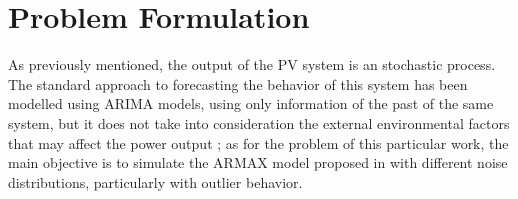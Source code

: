 \section{Problem Formulation}\label{sec:probForm}
As previously mentioned, the output of the PV system is an stochastic process. The standard approach to forecasting the behavior of this system has been modelled using ARIMA models, using only information of the past of the same system, but it does not take into consideration the external environmental factors that may affect the power output \cite{li2014armax}; as for the problem of this particular work, the main objective is to simulate the ARMAX model proposed in \cite{li2014armax} with different noise distributions, particularly with outlier behavior.
